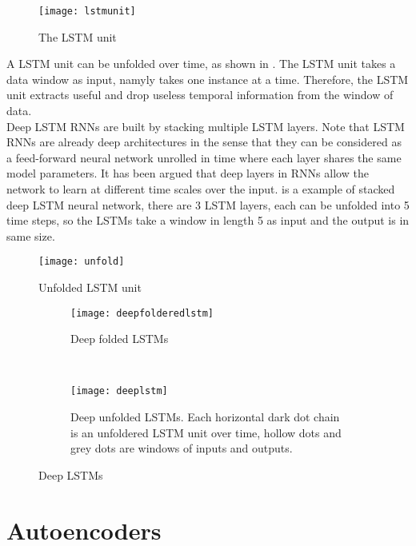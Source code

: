 \begin{figure}[ht]
\centering
\texttt{[image: lstmunit]}
\caption[LSTM unit]{The LSTM unit}
\label{fig:lstmunit}
\end{figure}


A LSTM unit can be unfolded over time, as shown in . The LSTM unit takes a data window as input, namyly takes one instance at a time. Therefore, the LSTM unit extracts useful and drop useless temporal information from the window of data.\\


Deep LSTM RNNs are built by stacking multiple LSTM layers. Note that LSTM RNNs are already deep architectures in the sense that they can be considered as a feed-forward neural network unrolled in time where each layer shares the same model parameters. It has been argued that deep layers in RNNs allow the network to learn at different time scales over the input\cite{deep}.  is a example of stacked deep LSTM neural network, there are 3 LSTM layers, each can be unfolded into 5 time steps, so the LSTMs take a window in length 5 as input and the output is in same size.

\begin{figure}[h]
\centering
\texttt{[image: unfold]}
\caption[Unfolded LSTM unit]{Unfolded LSTM unit}
\label{fig:unfolded}
\end{figure}

\begin{figure}[h]
\centering
	\begin {subfigure}[t]{0.45\textwidth}
	\centering
	\texttt{[image: deepfolderedlstm]}
	\caption{Deep folded LSTMs}
	\label{fig:deeplstm1}
	\end{subfigure}
	~
	\begin {subfigure}[t]{0.45\textwidth}
	\centering
	\texttt{[image: deeplstm]}
	\caption{Deep unfolded LSTMs. Each horizontal dark dot chain is an unfoldered LSTM unit over time, hollow dots and grey dots are windows of inputs and outputs.}
	\label{fig:deeplstm2}
	\end{subfigure}
	\caption[Deep LSTMs]{Deep LSTMs}
\label{fig:deeplstm}

\end{figure}

\section{Autoencoders}
\label{sec:Autoencoders}

